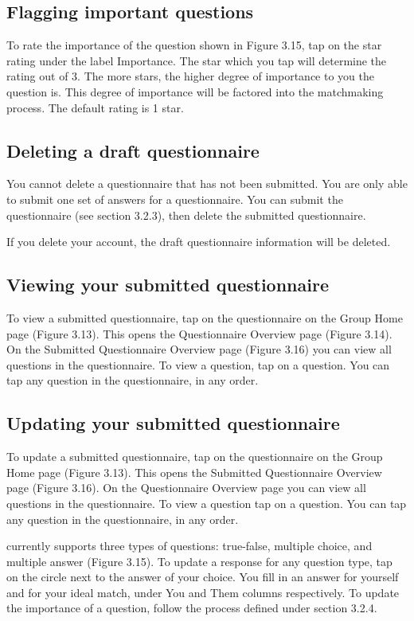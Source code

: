 \subsection{Flagging important questions}
\label{sec:questionnaire-importance}
To rate the importance of the question shown in Figure 3.15, tap on the star rating  under the label Importance.  The star which you tap will determine the rating out of 3.  The more stars, the higher degree of  importance to you the question is.  This degree of importance will be factored into the matchmaking process.  The default rating is 1 star. 

\subsection{Deleting a draft questionnaire}
\label{sec:questionnaire-delete}
You cannot delete a questionnaire that has not been submitted.   You are only able to submit one set of answers for a questionnaire.  You can submit the questionnaire (see section 3.2.3), then delete the submitted questionnaire.

If you delete your account, the draft questionnaire information will be deleted.

\subsection{Viewing your submitted questionnaire}
\label{sec:questionnaire-submitted-view}
To view a submitted questionnaire, tap on the questionnaire on the Group Home page (Figure 3.13). This opens the Questionnaire Overview page (Figure 3.14).   On the Submitted Questionnaire Overview page (Figure 3.16) you can view all questions in the questionnaire.  To view a question, tap on a question.  You can tap any question in the questionnaire, in any order.  

\subsection{Updating your submitted questionnaire}
\label{sec:questionnaire-submitted-update}
To update a submitted questionnaire, tap on the questionnaire on the Group Home page (Figure 3.13). This opens the Submitted Questionnaire Overview page (Figure 3.16).  On the Questionnaire Overview page you can view all questions in the questionnaire.  To view a question tap on a question.  You can tap any question in the questionnaire, in any order.  

\Friending{} currently supports three types of questions: true-false, multiple choice, and multiple answer (Figure 3.15).  To update a response for any question type, tap on the circle next to the answer of your choice.  You fill in an answer for yourself and for your ideal match, under You and Them columns respectively.   To update the importance of a question, follow the process defined under section 3.2.4.

